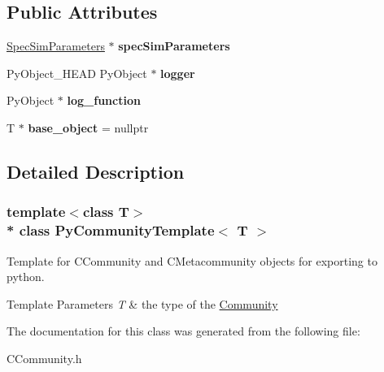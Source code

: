 \subsection*{Public Attributes}
\begin{DoxyCompactItemize}
\item 
\hyperlink{struct_spec_sim_parameters}{Spec\+Sim\+Parameters} $\ast$ {\bfseries spec\+Sim\+Parameters}\hypertarget{class_py_community_template_a37402f384e75c02c50360cecfe6b2267}{}\label{class_py_community_template_a37402f384e75c02c50360cecfe6b2267}

\item 
Py\+Object\+\_\+\+H\+E\+AD Py\+Object $\ast$ {\bfseries logger}\hypertarget{class_py_template_a5b741a472639d65f9bcad29afa16ec99}{}\label{class_py_template_a5b741a472639d65f9bcad29afa16ec99}

\item 
Py\+Object $\ast$ {\bfseries log\+\_\+function}\hypertarget{class_py_template_a98bb8152faa73d028342d5cf260f0372}{}\label{class_py_template_a98bb8152faa73d028342d5cf260f0372}

\item 
T $\ast$ {\bfseries base\+\_\+object} = nullptr\hypertarget{class_py_template_ac7bf12e84289f480eaa79fd7c421614a}{}\label{class_py_template_ac7bf12e84289f480eaa79fd7c421614a}

\end{DoxyCompactItemize}


\subsection{Detailed Description}
\subsubsection*{template$<$class T$>$\\*
class Py\+Community\+Template$<$ T $>$}

Template for C\+Community and C\+Metacommunity objects for exporting to python. 


\begin{DoxyTemplParams}{Template Parameters}
{\em T} & the type of the \hyperlink{class_community}{Community} \\
\hline
\end{DoxyTemplParams}


The documentation for this class was generated from the following file\+:\begin{DoxyCompactItemize}
\item 
C\+Community.\+h\end{DoxyCompactItemize}
